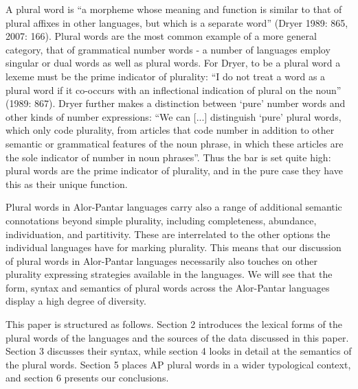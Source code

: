 A plural word is {\textquotedblleft}a morpheme whose meaning and function is similar to that of plural affixes in other languages, but which is a separate word{\textquotedblright} (Dryer 1989: 865, 2007: 166). Plural words are the most common example of a more general category, that of grammatical number words - a number of languages employ singular or dual words as well as plural words. For Dryer, to be a plural word a lexeme must be the prime indicator of plurality: {\textquotedblleft}I do not treat a word as a plural word if it co-occurs with an inflectional indication of plural on the noun{\textquotedblright} (1989: 867). Dryer further makes a distinction between {\textquoteleft}pure{\textquoteright} number words and other kinds of number expressions: {\textquotedblleft}We can [...] distinguish {\textquoteleft}pure{\textquoteright} plural words, which only code plurality, from articles that code number in addition to other semantic or grammatical features of the noun phrase, in which these articles are 
the sole indicator of number in noun phrases{\textquotedblright}. Thus the bar is set quite high: plural words are the prime indicator of plurality, and in the pure case they have this as their unique function.

 Plural words in Alor-Pantar languages carry also a range of additional semantic connotations beyond simple plurality, including completeness, abundance, individuation, and partitivity. These are interrelated to the other options the individual languages have for marking plurality. This means that our discussion of plural words in Alor-Pantar languages necessarily also touches on other plurality expressing strategies available in the languages. We will see that the form, syntax and semantics of plural words across the Alor-Pantar languages display a high degree of diversity.

This paper is structured as follows. Section 2 introduces the lexical forms of the plural words of the languages and the sources of the data discussed in this paper. Section 3 discusses their syntax, while section 4 looks in detail at the semantics of the plural words. Section 5 places AP plural words in a wider typological context, and section 6 presents our conclusions.

